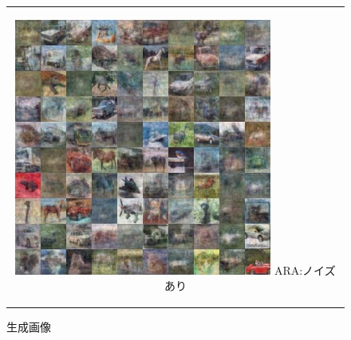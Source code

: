 \documentclass[12pt]{jsarticle}
\begin{document}
\begin{figure}[h]
\begin{center}
\begin{tabular}{c}
      \begin{minipage}{0.33\hsize}
        \begin{center}
          \includegraphics[clip, width=\linewidth]{train_ln250_mode_ARA_ln_300-dn_100_tn_100_noise_1.png}
          \hspace{0.2cm} ARA:ノイズあり
        \end{center}
      \end{minipage}


    \end{tabular}
    \caption{生成画像}
     \label{fig:accuracy}
  \end{center}
\end{figure}
\end{document}

